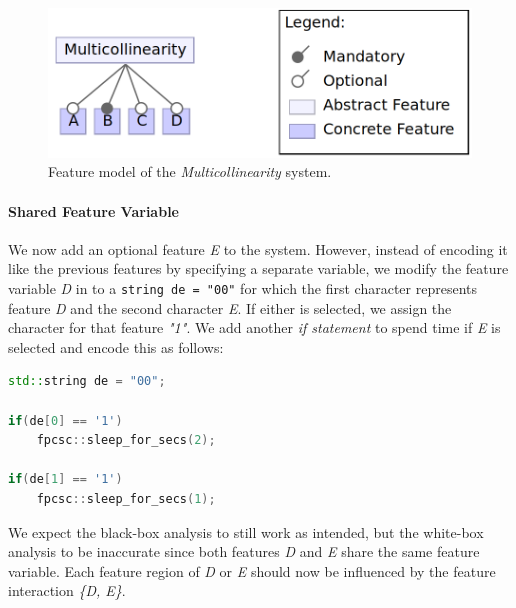 \begin{figure}[h]
    \centering
    \includegraphics[scale=0.25]{gfx/Multicollinearity.png}
    \caption{Feature model of the \emph{Multicollinearity} system.}
    \label{fig:multicollinearity}
\end{figure}

\paragraph{Shared Feature Variable}\label{ground-truth:Shared}
We now add an optional feature \emph{E} to the system. 
However, instead of encoding it like the previous features by specifying a separate variable, 
we modify the feature variable \emph{D} in  to a \texttt{string de = "00"} 
for which the first character represents feature \emph{D} and the second character \emph{E}. If either is selected, 
we assign the character for that feature \emph{"1"}. We add another \emph{if statement} to spend time if \emph{E} is selected and encode this as follows:

\begin{minipage}{\linewidth}
\begin{lstlisting}[language=C++,label={lst:shared},escapechar=|]
std::string de = "00";

if(de[0] == '1')
    fpcsc::sleep_for_secs(2);

if(de[1] == '1')
    fpcsc::sleep_for_secs(1);
\end{lstlisting}
\end{minipage}

We expect the black-box analysis to still work as intended, but the white-box analysis to be inaccurate since both features \emph{D} and \emph{E} share the same feature variable. 
Each feature region of \emph{D} or \emph{E} should now be influenced by the feature interaction \emph{\{D, E\}}.